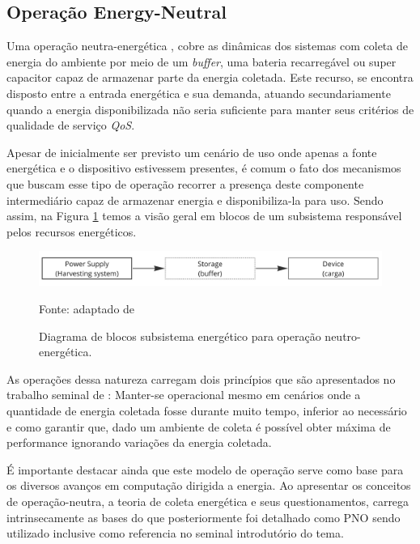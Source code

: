 \subsection{Operação Energy-Neutral}
Uma operação neutra-energética \cite{kansal_power_2007}, cobre as dinâmicas dos sistemas com coleta de energia do ambiente por meio de um \textit{buffer}, uma bateria recarregável ou super capacitor capaz de armazenar parte da energia coletada. Este recurso, se encontra disposto entre a entrada energética e sua demanda, atuando secundariamente quando a energia disponibilizada não seria suficiente para manter seus critérios de qualidade de serviço \textit{QoS}.

Apesar de inicialmente ser previsto um cenário de uso onde apenas a fonte energética e o dispositivo estivessem presentes, é comum o fato dos mecanismos que buscam esse tipo de operação recorrer a presença deste componente intermediário capaz de armazenar energia e disponibiliza-la para uso. Sendo assim, na Figura \ref{fig:cap2harveststoreuse} temos a visão geral em blocos de um subsistema responsável pelos recursos energéticos.

\begin{figure}[H]
	\centering
	\caption{Diagrama de blocos subsistema energético para operação neutro-energética.}
	\label{fig:cap2harveststoreuse}
	\includegraphics[width=0.7\linewidth]{Imagens/cap2/cap2harvest_store_use}	
	
	Fonte: adaptado de \cite{sudevalayam_energy_2011} 
\end{figure}



As operações dessa natureza carregam dois princípios que são apresentados no trabalho seminal de \cite{kansal_power_2007}: Manter-se operacional mesmo em cenários onde a quantidade de energia coletada fosse durante muito tempo, inferior ao necessário e como garantir que, dado um ambiente de coleta é possível obter máxima de performance ignorando variações da energia coletada. 

É importante destacar ainda que este modelo de operação serve como base para os diversos avanços em computação dirigida a energia. Ao apresentar os conceitos de operação-neutra, a teoria de coleta energética e seus questionamentos, carrega intrinsecamente as bases do que posteriormente foi detalhado como \acf{PNO} sendo utilizado inclusive como referencia no seminal \cite{merrett_energy-driven_2017} introdutório do tema.




